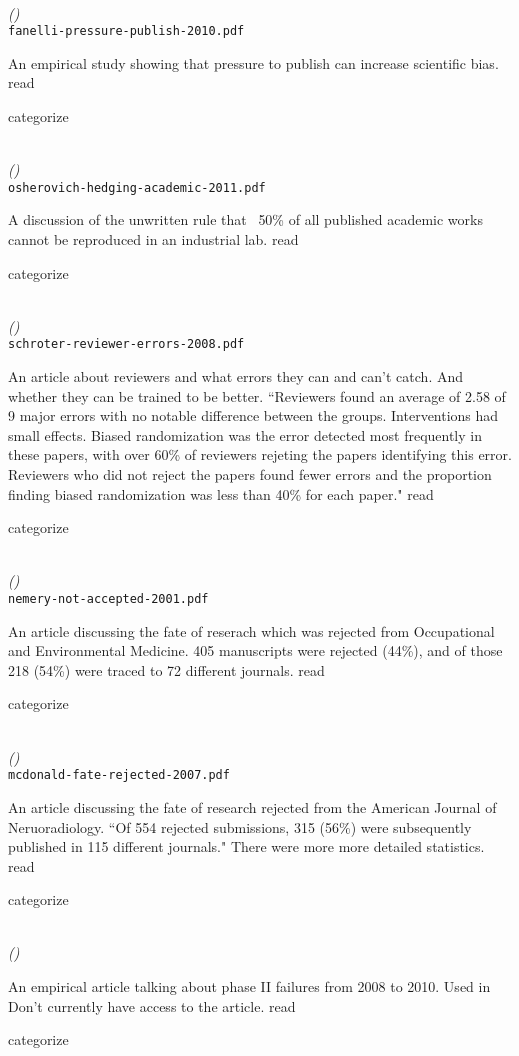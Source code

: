 \documentclass[american]{article}
\newcommand{\Read}{
	\gls{read}
}
\newcommand{\categorize}{
	\gls{categorize}
}
\newenvironment{refdef}[2] {
	\noindent \textbf{\citetitle{#1}} \cite{#1}\\ \citejournalorbooktitle{#1} \textit{(\citeyear{#1})}\\ \texttt{#2} \vspace{0.2in} \par 
} {
\vspace{0.2in}
}
\begin{document}
\begin{refdef}{fanelli-pressure-publish-2010}{fanelli-pressure-publish-2010.pdf}
An empirical study showing that pressure to publish can increase scientific bias. \Read \categorize
\end{refdef}

\begin{refdef}{osherovich-hedging-academic-2011}{osherovich-hedging-academic-2011.pdf}
A discussion of the unwritten rule that ~50\% of all published academic works cannot be reproduced in an industrial lab. \Read \categorize
\end{refdef}

\begin{refdef}{schroter-reviewer-errors-2008}{schroter-reviewer-errors-2008.pdf}
An article about reviewers and what errors they can and can't catch. And whether they can be trained to be better. ``Reviewers found an average of 2.58 of 9 major errors with no notable difference between the groups. Interventions had small effects. Biased randomization was the error detected most frequently in these papers, with over 60\% of reviewers rejeting the papers identifying this error. Reviewers who did not reject the papers found fewer errors and the proportion finding biased randomization was less than 40\% for each paper." \Read \categorize
\end{refdef}

\begin{refdef}{nemery-not-accepted-2001}{nemery-not-accepted-2001.pdf}
An article discussing the fate of reserach which was rejected from Occupational and Environmental Medicine. 405 manuscripts were rejected (44\%), and of those 218 (54\%) were traced to 72 different journals. \Read \categorize
\end{refdef}

\begin{refdef}{mcdonald-fate-rejected-2007}{mcdonald-fate-rejected-2007.pdf}
An article discussing the fate of research rejected from the American Journal of Neruoradiology. ``Of 554 rejected submissions, 315 (56\%) were subsequently published in 115 different journals." There were more more detailed statistics. \Read \categorize
\end{refdef}

\begin{refdef}{arrowsmith-phase-ii-failures-2011}{}
An empirical article talking about phase II failures from 2008 to 2010. Used in \cite{Begley2012} Don't currently have access to the article. \Read \categorize
\end{refdef}
\end{document}
